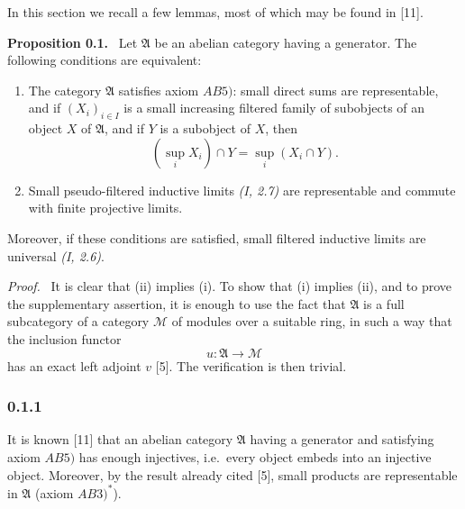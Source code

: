 \documentclass[11pt]{article}
\newcommand{\A}{\mathfrak{A}}
\newcommand{\Mcat}{\mathcal{M}}
\newcommand{\ie}{i.e.}
\newenvironment{statement}[1]{\par\medskip\noindent\textbf{#1.}\ }{\par\medskip}
\newenvironment{prooftext}{\par\noindent\emph{Proof.}\ }{\par\medskip}
\begin{document}
In this section we recall a few lemmas, most of which may be found in [11].

\begin{statement}{Proposition 0.1}
Let $\A$ be an abelian category having a generator. The following conditions are equivalent:
\begin{enumerate}[label=(\roman*)]
\item The category $\A$ satisfies axiom $AB5)$: small direct sums are representable, and if $(X_i)_{i\in I}$ is a small increasing filtered family of subobjects of an object $X$ of $\A$, and if $Y$ is a subobject of $X$, then
\[
\left(\sup_i X_i\right)\cap Y=\sup_i (X_i\cap Y).
\]
\item Small pseudo-filtered inductive limits \emph{(I, 2.7)} are representable and commute with finite projective limits.
\end{enumerate}
Moreover, if these conditions are satisfied, small filtered inductive limits are universal \emph{(I, 2.6)}.
\end{statement}

\begin{prooftext}
It is clear that (ii) implies (i). To show that (i) implies (ii), and to prove the supplementary assertion, it is enough to use the fact that $\A$ is a full subcategory of a category $\Mcat$ of modules over a suitable ring, in such a way that the inclusion functor
\[
u:\A\longrightarrow \Mcat
\]
has an exact left adjoint $v$ [5]. The verification is then trivial.
\end{prooftext}

\subsubsection*{0.1.1}
It is known [11] that an abelian category $\A$ having a generator and satisfying axiom $AB5)$ has enough injectives, \ie\ every object embeds into an injective object. Moreover, by the result already cited [5], small products are representable in $\A$ (axiom $AB3)^*$).
\end{document}
